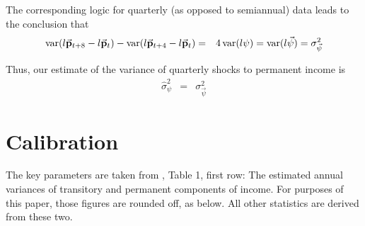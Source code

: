 \documentclass[11pt,letterpaper]{article}
\begin{document}
The corresponding logic for quarterly (as opposed to semiannual) data leads to the conclusion that
\begin{eqnarray}
  \operatorname{var}(l\vec{\mathbf{p}}_{t+8}-l\vec{\mathbf{p}}_{t}) - \operatorname{var}(l\vec{\mathbf{p}}_{t+4} - l\vec{\mathbf{p}}_{t}) & = & 4 \operatorname{var}(l{\psi}) = \operatorname{var}(l{\vec{\psi}}) =\sigma^{2}_{\vec{\psi}} \label{eq:varvecp}
\end{eqnarray}

Thus, our estimate of the variance of quarterly shocks to permanent income is
\begin{eqnarray}
  \hat{\sigma}^{2}_{\psi} & = & \sigma^{2}_{\vec{\psi}} \label{eq:varlpShkQtr}
\end{eqnarray}

\begin{comment}
\section{Muth Updating Formula}

In a context similar to the one outlined here, \cite{muthOptimal} showed that a consumer who
only observes actual income but wants to know permanent income will form a rational
estimate of permanent income from 
\begin{eqnarray}
  \bar{\mathbf{p}}_{t} & = & \pi \left[ y_{t}+(1-\pi)y_{t-1}+(1-\pi)^{2}y_{t-2}+\ldots\right]
\end{eqnarray}
where
\begin{eqnarray}
  \pi & = & \left(\frac{\sigma^{2}_{\psi}}{\sigma^{2}_{\psi}+\sigma^{2}_{\theta}}\right) \label{eq:pieq}
\end{eqnarray}
\end{comment}

\section{Calibration}

The key parameters are taken from \cite{carroll&samwick:nature}, Table 1, first row:
The estimated annual variances of transitory and permanent components of income.  
For purposes of this paper, those figures are rounded off, as below.  All other
statistics are derived from these two.

\begin{center}

\end{center}
\begin{comment}
Note (as per the footnote of the table) that these parameters imply an implausibly
low value of $\pi$ (equivalently, an implausibly high value for the serial correlation
coefficient of consumption growth, $(1-\pi)$).
\end{comment}

 

\end{document}

